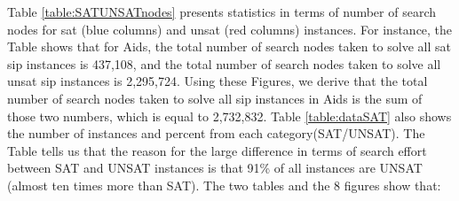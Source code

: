 \documentclass{l4proj}
\begin{document}
Table \ref{table:SATUNSATnodes} presents statistics in terms of number of search nodes for \gls{sat} (blue columns) and \gls{unsat} (red columns) instances. For instance, the Table shows that for Aids, the total number of search nodes taken to solve all \gls{sat} \gls{sip} instances is 437,108, and the total number of search nodes taken to solve all \gls{unsat} \gls{sip} instances is 2,295,724. Using these Figures, we derive that the total number of search nodes taken to solve all \gls{sip} instances in Aids is the sum of those two numbers, which is equal to 2,732,832. Table \ref{table:dataSAT} also shows the number of instances and percent from each category(SAT/UNSAT). The Table tells us that the reason for the large difference in terms of search effort between SAT and UNSAT instances is that 91\% of all instances are UNSAT (almost ten times more than SAT). The two tables and the 8 figures show that:
\end{document}

